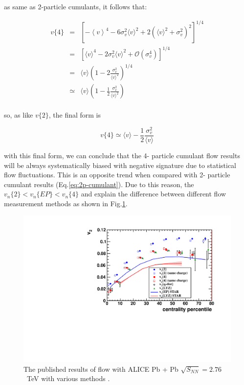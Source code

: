 as same as 2-particle cumulants, it follows that:

\begin{eqnarray}
	v\{4\} &=& \left[ -\left\langle v \right\rangle^4 - 6 \sigma_v^2 \langle v \rangle^2 + 2\left( \langle v \rangle^2 + \sigma_v^2 \right)^2 \right]^{1/4} \\
	&=& \left[ \langle v \rangle^4 - 2 \sigma_v^2 \langle v \rangle ^2 + \mathcal{O}(\sigma_v^4) \right]^{1/4} \\
	&=& \langle v \rangle \left(1 - 2 \frac{\sigma_v^2}{\langle v \rangle^2} \right) ^{1/4} \\
	&\simeq & \langle v \rangle \left( 1 - \frac{1}{2} \frac{\sigma_v^2}{\langle v \rangle^2} \right)	\\
\end{eqnarray}

so, as like $v\{2\}$, the final form is

\begin{equation}
	v\{4\} \simeq \langle v \rangle - \frac{1}{2} \frac{\sigma_v^2}{\langle v \rangle} 
\end{equation}
\smallskip

with this final form, we can conclude that the 4- particle cumulant flow results will be always systematically biased with negative signature due to statistical flow fluctuations. This is an opposite trend when compared with 2- particle cumulant results (Eq.\ref{eq:2p-cumulant}). Due to this reason, the $v_n\{2\} < v_n\{EP\} < v_n\{4\}$ and explain the difference between different flow measurement methods as shown in Fig.\ref{fig:alice_flow_result}.



\begin{figure}[!h]
\centerline{\includegraphics[width=12.0cm]{figures/alice_flow_result}}
\caption{ The published results of flow with ALICE Pb + Pb $\sqrt{S_{NN}}=2.76$~TeV with various methods \cite{Aamodt:2010pa}.} 
\label{fig:alice_flow_result}
\end{figure}


